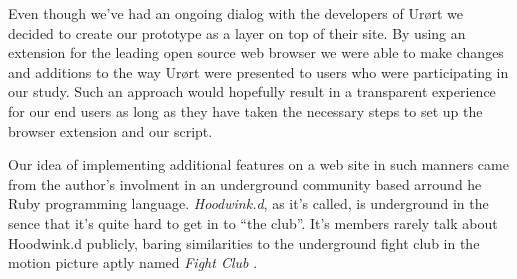 Even though we've had an ongoing dialog with the developers of Ur\o{}rt we
decided to create our prototype as a layer on top of their site.
By using an
extension%
for the leading open source%
web browser we were able to make changes and additions to the way Ur\o{}rt
were presented to users who were participating in our study.
Such an approach would hopefully result in a transparent experience for our
end users as long as they have taken the necessary steps to set up the browser
extension and our script.

Our idea of implementing additional features on a web site in such manners
came from the author's involment in an underground community based arround
he Ruby%
programming language. \emph{Hoodwink.d}, as it's called, is underground in the
sence that it's quite hard to get in to ``the club''. It's members rarely talk
about Hoodwink.d publicly, baring similarities to the underground fight club
in the motion picture aptly named \emph{Fight Club}%
.
